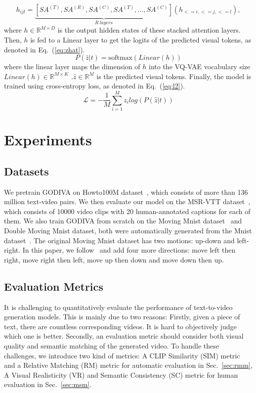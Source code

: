 \documentclass{article}
\begin{document}
\begin{equation} \label{eq:hijl} 
h_{ijl}=\underbrace{\left[SA^{(T)},SA^{(R)},SA^{(C)},SA^{(T)},...,SA^{(C)}\right]}_{R~layers}(h_{<=i,<=j,<=l}),
\end{equation}
where $h\in \mathbb{R}^{M\times D}$ is the output hidden states of these stacked attention layers. Then, $h$ is fed to a Linear layer to get the logits of the predicted visual tokens, as denoted in Eq.~(\ref{eq:zhat}).
\begin{equation} \label{eq:zhat} 
P(\hat{z}|t)=\textrm{softmax}(Linear(h))
\end{equation}where the linear layer  maps the dimension of  $h$ into the VQ-VAE vocabulary size $Linear(h) \in \mathbb{R}^{M\times K}$ .$\hat{z} \in \mathbb{R}^{M}$ is the predicted visual tokens. Finally, the model is trained using cross-entropy loss, as denoted in Eq.~(\ref{eq:l2}).
\begin{equation} \label{eq:l2} 
\mathscr{L}=-\frac{1}{M}\sum_{i=1}^{M}z_ilog(P(\hat{z}|t))
\end{equation}

\section{Experiments}

\subsection{Datasets}
We pretrain GODIVA on Howto100M dataset~\cite{miechHowto100mLearningTextvideo2019}, which consists of more than 136 million text-video pairs. We then evaluate our model on the MSR-VTT dataset~\cite{xuMsrvttLargeVideo2016}, which consists of 10000 video clips with 20 human-annotated captions for each of them. We also train GODIVA from scratch on the Moving Mnist dataset~\cite{mittalSyncdrawAutomaticVideo2017} and Double Moving Mnist dataset, both were automatically generated from the Mnist dataset~\cite{LeCun_Backpropagationappliedhandwritten_1989}. The original Moving Mnist dataset has two motions: up-down and left-right. In this paper, we follow~\cite{dengIRCGANIntrospectiveRecurrent2019} and add four more directions: move left then right, move right then left, move up then down and move down then up.
\subsection{Evaluation Metrics}
It is challenging to quantitatively evaluate the performance of text-to-video generation models. This is mainly due to two reasons: Firstly, given a piece of text, there are countless corresponding videos. It is hard to objectively judge which one is better. Secondly, an evaluation metric should consider both visual quality and semantic matching of the generated video. To handle these challenges, we introduce two kind of metrics: A CLIP Similarity (SIM) metric and a Relative Matching (RM) metric for automatic evaluation in Sec.~\ref{sec:rmm},  A Visual Realisticity (VR) and Semantic Consistency (SC) metric for human evaluation in Sec.~\ref{sec:msm}.
\end{document}
